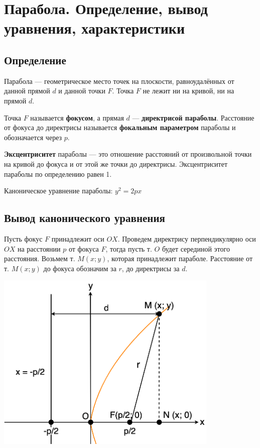 \documentclass[a4paper,12pt]{extbook}
\theoremstyle{named}
\theoremstyle{named}
\begin{document}
\section{Парабола. Определение, вывод уравнения, характеристики}\label{sec:parabola}

\subsection*{Определение}
Парабола — геометрическое место точек на плоскости, равноудалённых от данной прямой \(d\) и данной точки \(F\).
Точка \(F\) не лежит ни на кривой, ни на прямой \(d\).

Точка \(F\) называется \textbf{фокусом}, а прямая \(d\) — \textbf{директрисой параболы}.
Расстояние от фокуса до директрисы называется \textbf{фокальным параметром} параболы и обозначается через \(p\).

\textbf{Эксцентриситет} параболы — это отношение расстояний от произвольной точки на кривой до фокуса и от этой же точки до директрисы.
Эксцентриситет параболы по определению равен 1.

Каноническое уравнение параболы: \(y^2 = 2px\)

\subsection*{Вывод канонического уравнения}

Пусть фокус \(F\) принадлежит оси \(OX\).
Проведем директрису перпендикулярно оси \(OX\) на расстоянии \(p\) от фокуса \(F\), тогда пусть т. \(O\) будет серединой этого расстояния.
Возьмем т. \(M(x; y)\), которая принадлежит параболе.
Расстояние от т. \(M(x; y)\) до фокуса обозначим за \(r\), до директрисы за \(d\).

\begin{center}
    \includegraphics[width=0.8\textwidth]{parabola.png}
\end{center}
\end{document}
